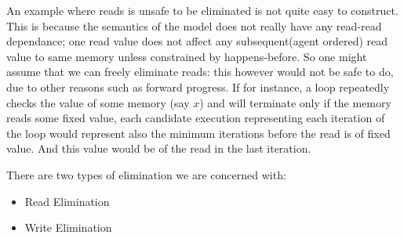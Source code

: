     An example where reads is unsafe to be eliminated is not quite easy to construct.
    This is because the semantics of the model does not really have any read-read dependance; one read value does not affect any subsequent(agent ordered) read value to same memory unless constrained by happens-before.
    So one might assume that we can freely eliminate reads: this however would not be safe to do, due to other reasons such as forward progress.
    If for instance, a loop repeatedly checks the value of some memory (say $x$) and will terminate only if the memory reads some fixed value, each candidate execution representing each iteration of the loop would represent also the minimum iterations before the read is of fixed value. 
    And this value would be of the read in the last iteration. 
    

    There are two types of elimination we are concerned with:
    \begin{itemize}
        \item Read Elimination
        \item Write Elimination
    \end{itemize}
